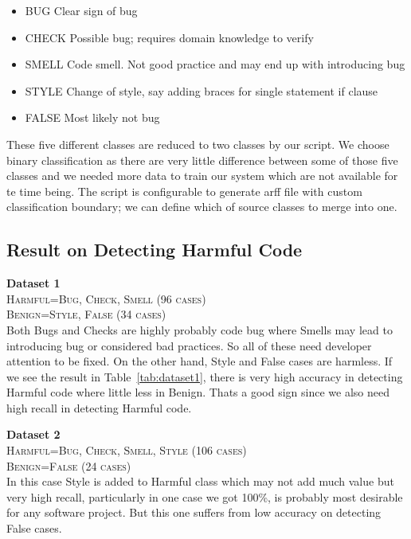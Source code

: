 \documentclass[nocopyrightspace]{sigplanconf}
\begin{document}
\begin{itemize}
\item BUG		Clear sign of bug
\item CHECK	Possible bug; requires domain knowledge to verify
\item SMELL	Code smell. Not good practice and may end up with introducing bug
\item STYLE     	Change of style, say adding braces for single statement if clause
\item FALSE     	Most likely not bug
\end{itemize}

\vspace{10 pt}
\noindent
These five different classes are reduced to two classes by our script. We choose binary classification as there are very little difference between some of those five classes and we needed more data to train our system which are not available for te time being. The script is configurable to generate arff file with custom classification boundary; we can define which of source classes to merge into one.

\subsection{Result on Detecting Harmful Code}
\textbf{Dataset 1}\\
\textsc{Harmful=Bug, Check, Smell (96 cases)}\\
\textsc{Benign=Style, False (34 cases)}\\

\noindent
Both Bugs and Checks are highly probably code bug where Smells may lead to introducing bug or considered bad practices. So all of these need developer attention to be fixed. On the other hand, Style and False cases are harmless. If we see the result in Table~\ref{tab:dataset1}, there is very high accuracy in detecting Harmful code where little less in Benign. Thats a good sign since we also need high recall in detecting Harmful code.

\vspace{10 pt}
\noindent
\textbf{Dataset 2}\\
\textsc{Harmful=Bug, Check, Smell, Style (106 cases)}\\
\textsc{Benign=False (24 cases)}\\

\noindent
In this case Style is added to Harmful class which may not add much value but very high recall, particularly in one case we got 100\%, is probably most desirable for any software project. But this one suffers from low accuracy on detecting False cases.
\end{document}
